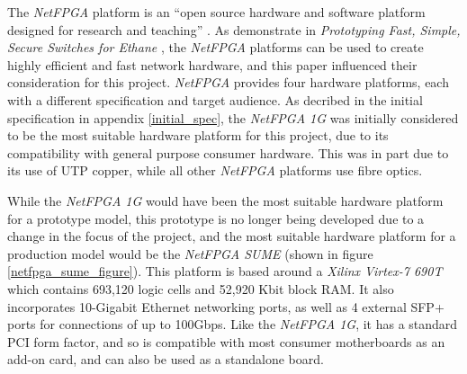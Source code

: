 

The \textit{NetFPGA} platform is an ``open source hardware and software platform designed for research and teaching'' \cite{NetFPGA}.
As demonstrate in \textit{Prototyping Fast, Simple, Secure Switches for Ethane} \cite{4296810}, the \textit{NetFPGA} platforms can be used to create highly efficient and fast network hardware, and this paper influenced their consideration for this project.
\textit{NetFPGA} provides four hardware platforms, each with a different specification and target audience. As decribed in the initial specification in appendix \ref{initial_spec}, the \textit{NetFPGA 1G} was initially considered to be the most suitable hardware platform for this project, due to its compatibility with general purpose consumer hardware.
This was in part due to its use of UTP copper, while all other \textit{NetFPGA} platforms use fibre optics.

While the \textit{NetFPGA 1G} would have been the most suitable hardware platform for a prototype model, this prototype is no longer being developed due to a change in the focus of the project, and the most suitable hardware platform for a production model would be the \textit{NetFPGA SUME} (shown in figure \ref{netfpga_sume_figure}). This platform is based around a \textit{Xilinx Virtex-7 690T} \cite{virtex7-690t} which contains 693,120 logic cells and 52,920 Kbit block RAM. It also incorporates 10-Gigabit Ethernet networking ports, as well as 4 external SFP+ ports for connections of up to 100Gbps. Like the \textit{NetFPGA 1G}, it has a standard PCI form factor, and so is compatible with most consumer motherboards as an add-on card, and can also be used as a standalone board.


